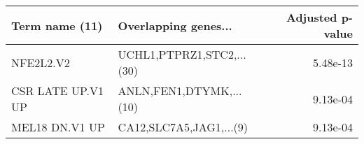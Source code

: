 \begin{tabular}{llr}
\toprule
   Term name (11) &      Overlapping genes... &  Adjusted p-value \\
\midrule
        NFE2L2.V2 & UCHL1,PTPRZ1,STC2,...(30) &          5.48e-13 \\
CSR LATE UP.V1 UP &   ANLN,FEN1,DTYMK,...(10) &          9.13e-04 \\
   MEL18 DN.V1 UP &   CA12,SLC7A5,JAG1,...(9) &          9.13e-04 \\
\bottomrule
\end{tabular}
